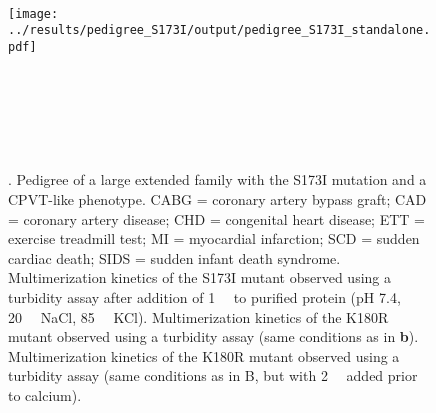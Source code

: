 \begin{figure}
\begin{fullpanelvar}
    \textbf{\figurepanela}\\%
    \texttt{[image: ../results/pedigree\_S173I/output/pedigree\_S173I\_standalone.pdf]}
\end{fullpanelvar}
\hfill
\begin{fullpanelvar}
    \textbf{\figurepanelb}\\%
    
\end{fullpanelvar}
\hspace*{1cm}
\begin{fullpanelvar}
    \textbf{\figurepanelc}\\%
    
\end{fullpanelvar}
\rowspacersmall
\begin{fullpanelvar}
    \textbf{\figurepaneld}\\%
    
\end{fullpanelvar}
\caption[Dominant cardiac calsequestrin disease mutations]{\textbf{\headingsubsectionone}. \figurepanelcaptiona Pedigree of a large extended family with the S173I mutation and a CPVT-like phenotype. CABG = coronary artery bypass graft; CAD = coronary artery disease; CHD = congenital heart disease; ETT = exercise treadmill test; MI = myocardial infarction; SCD = sudden cardiac death; SIDS = sudden infant death syndrome. \figurepanelcaptionb Multimerization kinetics of the S173I mutant observed using a turbidity assay after addition of \SI{1}{\milli\Molar}  to purified protein (pH 7.4, \SI{20}{\milli\Molar} NaCl, \SI{85}{\milli\Molar} KCl). \figurepanelcaptionc Multimerization kinetics of the K180R mutant observed using a turbidity assay (same conditions as in \textbf{b}). \figurepanelcaptiond Multimerization kinetics of the K180R mutant observed using a turbidity assay (same conditions as in B, but with \SI{2}{\milli\Molar}  added prior to calcium).}
\label{fig:S173I_genetics_and_biochemistry}
\end{figure}

